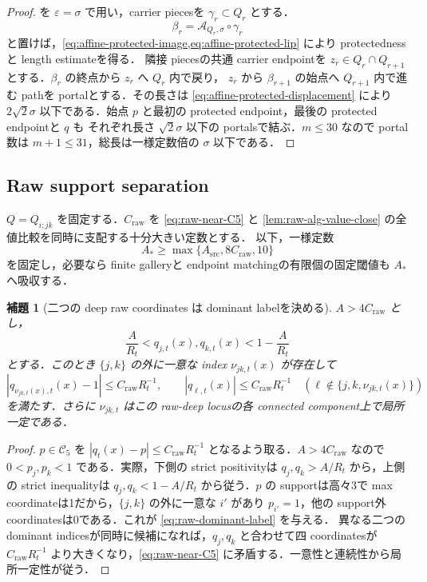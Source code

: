 \documentclass[a4paper,11pt]{ltjsarticle}
\numberwithin{equation}{section}
\theoremstyle{plain}
\newtheorem{lemma}[lemma]{補題}
\theoremstyle{definition}
\theoremstyle{remark}
\newcommand{\cC}{\mathcal C}
\begin{document}
\begin{proof}
 を $\varepsilon=\sigma$ で用い，carrier piecesを $\gamma_r\subset Q_r$ とする．
\[
 \beta_r=\mathscr A_{Q_r,\sigma}\circ\gamma_r
\]
と置けば，\cref{eq:affine-protected-image,eq:affine-protected-lip} により protectednessと length estimateを得る．
隣接 piecesの共通 carrier endpointを $z_r\in Q_r\cap Q_{r+1}$ とする．$\beta_r$ の終点から $z_r$ へ $Q_r$ 内で戻り，
$z_r$ から $\beta_{r+1}$ の始点へ $Q_{r+1}$ 内で進む pathを portalとする．その長さは
\cref{eq:affine-protected-displacement} により $2\sqrt2\sigma$ 以下である．始点 $p$ と最初の protected endpoint，最後の protected endpointと $q$ も
それぞれ長さ $\sqrt2\sigma$ 以下の portalsで結ぶ．$m\le30$ なので portal数は $m+1\le31$，総長は一様定数倍の $\sigma$ 以下である．
\end{proof}

\subsection{Raw support separation}

$Q=Q_{i;jk}$ を固定する．$C_{\mathrm{raw}}$ を \eqref{eq:raw-near-C5} と
\cref{lem:raw-alg-value-close} の全値比較を同時に支配する十分大きい定数とする．
以下，一様定数
\begin{equation}\label{eq:A-star-choice}
 A_*\ge\max\{A_{\mathrm{src}},8C_{\mathrm{raw}},10\}
\end{equation}
を固定し，必要なら finite galleryと endpoint matchingの有限個の固定閾値も $A_*$ へ吸収する．

\begin{lemma}[二つの deep raw coordinates は dominant labelを決める]\label{lem:raw-chamber-separation}
$A>4C_{\mathrm{raw}}$ とし，
\[
 \frac{A}{R_t}<q_{j,t}(x),q_{k,t}(x)<1-\frac{A}{R_t}
\]
とする．このとき $\{j,k\}$ の外に一意な index $\nu_{jk,t}(x)$ が存在して
\begin{equation}\label{eq:raw-dominant-label}
 |q_{\nu_{jk,t}(x),t}(x)-1|\le C_{\mathrm{raw}}R_t^{-1},\qquad
 |q_{\ell,t}(x)|\le C_{\mathrm{raw}}R_t^{-1}
 \quad(\ell\notin\{j,k,\nu_{jk,t}(x)\})
\end{equation}
を満たす．さらに $\nu_{jk,t}$ はこの raw-deep locusの各 connected component上で局所一定である．
\end{lemma}

\begin{proof}
$p\in\cC_5$ を $|q_t(x)-p|\le C_{\mathrm{raw}}R_t^{-1}$ となるよう取る．$A>4C_{\mathrm{raw}}$ なので
$0<p_j,p_k<1$ である．実際，下側の strict positivityは $q_j,q_k>A/R_t$ から，上側の strict inequalityは
$q_j,q_k<1-A/R_t$ から従う．$p$ の supportは高々3で max coordinateは1だから，$\{j,k\}$ の外に一意な $i'$ があり
$p_{i'}=1$，他の support外 coordinatesは0である．これが \eqref{eq:raw-dominant-label} を与える．
異なる二つの dominant indicesが同時に候補になれば，$q_j,q_k$ と合わせて四 coordinatesが
$C_{\mathrm{raw}}R_t^{-1}$ より大きくなり，\eqref{eq:raw-near-C5} に矛盾する．一意性と連続性から局所一定性が従う．
\end{proof}
\end{document}
